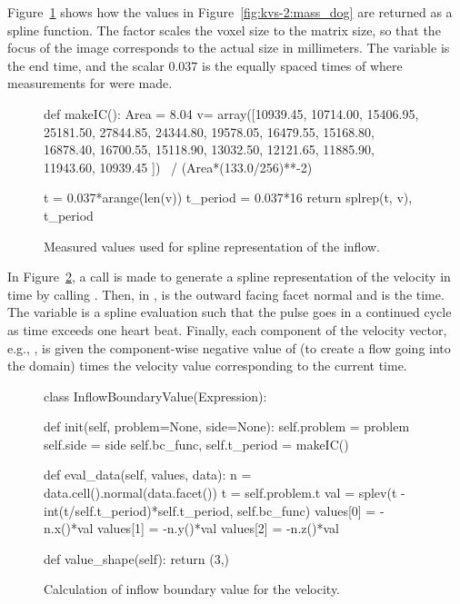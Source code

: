 Figure~\ref{fig:kvs-2:inflow_codeI} shows how the values in
Figure~\ref{fig:kvs-2:mass_dog} are returned as a spline function. The
factor  scales the voxel size to the matrix size,
so that the focus of the image corresponds to the actual size in
millimeters. The  variable is the end time, and the scalar
$0.037$ is the equally spaced times of where measurements for 
were made.

\begin{figure}
\begin{python}
def makeIC():
    Area = 8.04
    v= array([10939.45, 10714.00, 15406.95,
              25181.50, 27844.85, 24344.80,
              19578.05, 16479.55, 15168.80,
              16878.40, 16700.55, 15118.90,
              13032.50, 12121.65, 11885.90,
              11943.60, 10939.45 ]) \
                    / (Area*(133.0/256)**-2)

    t = 0.037*arange(len(v))
    t_period = 0.037*16
    return splrep(t, v), t_period
\end{python}
\caption{Measured values used for spline representation of the inflow.}
\label{fig:kvs-2:inflow_codeI}
\end{figure}

In Figure~\ref{fig:kvs-2:inflow_codeII}, a call is made to generate a spline
representation of the velocity in time by calling \emp{makeIC()}.
Then, in \emp{eval\_data}, \emp{n} is the outward facing facet normal
and \emp{t} is the time. The variable \emp{val} is a spline evaluation
such that the pulse goes in a continued cycle as time exceeds one
heart beat. Finally, each component of the velocity vector, e.g.,
\emp{values[0]}, is given the component-wise negative value of 
(to create a flow going into the domain) times the velocity value
corresponding to the current time.

\begin{figure}
\begin{python}
class InflowBoundaryValue(Expression):

    def init(self, problem=None, side=None):
        self.problem = problem
        self.side = side
        self.bc_func, self.t_period = makeIC()

    def eval_data(self, values, data):
        n = data.cell().normal(data.facet())
        t = self.problem.t
        val = splev(t - int(t/self.t_period)*self.t_period, self.bc_func)
        values[0] = -n.x()*val
        values[1] = -n.y()*val
        values[2] = -n.z()*val

    def value_shape(self):
        return (3,)
\end{python}
\caption{Calculation of inflow boundary value for the velocity.}
\label{fig:kvs-2:inflow_codeII}
\end{figure}

